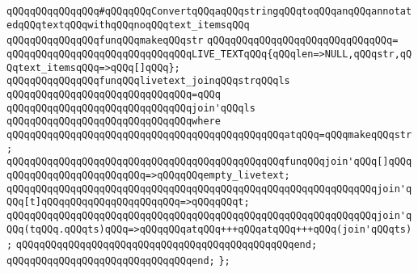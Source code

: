 \newline
\newline
\verb|qQQqqQQqqQQqqQQq#qQQqqQQqConvertqQQqaqQQqstringqQQqtoqQQqanqQQqannotatedqQQqtextqQQqwithqQQqnoqQQqtext_itemsqQQq|\newline
\newline
\verb|qQQqqQQqqQQqqQQqfunqQQqmakeqQQqstr|\newline
\verb|qQQqqQQqqQQqqQQqqQQqqQQqqQQqqQQq=|\newline
\verb|qQQqqQQqqQQqqQQqqQQqqQQqqQQqqQQqLIVE_TEXTqQQq{qQQqlen=>NULL,qQQqstr,qQQqtext_itemsqQQq=>qQQq[]qQQq};|\newline
\newline
\newline
\verb|qQQqqQQqqQQqqQQqfunqQQqlivetext_joinqQQqstrqQQqls|\newline
\verb|qQQqqQQqqQQqqQQqqQQqqQQqqQQqqQQq=qQQq|\newline
\verb|qQQqqQQqqQQqqQQqqQQqqQQqqQQqqQQqjoin'qQQqls|\newline
\verb|qQQqqQQqqQQqqQQqqQQqqQQqqQQqqQQqwhere|\newline
\verb|qQQqqQQqqQQqqQQqqQQqqQQqqQQqqQQqqQQqqQQqqQQqqQQqatqQQq=qQQqmakeqQQqstr;|\newline
\newline
\verb|qQQqqQQqqQQqqQQqqQQqqQQqqQQqqQQqqQQqqQQqqQQqqQQqfunqQQqjoin'qQQq[]qQQqqQQqqQQqqQQqqQQqqQQqqQQq=>qQQqqQQqempty_livetext;|\newline
\verb|qQQqqQQqqQQqqQQqqQQqqQQqqQQqqQQqqQQqqQQqqQQqqQQqqQQqqQQqqQQqqQQqjoin'qQQq[t]qQQqqQQqqQQqqQQqqQQqqQQq=>qQQqqQQqt;|\newline
\verb|qQQqqQQqqQQqqQQqqQQqqQQqqQQqqQQqqQQqqQQqqQQqqQQqqQQqqQQqqQQqqQQqjoin'qQQq(tqQQq.qQQqts)qQQq=>qQQqqQQqatqQQq+++qQQqatqQQq+++qQQq(join'qQQqts);|\newline
\verb|qQQqqQQqqQQqqQQqqQQqqQQqqQQqqQQqqQQqqQQqqQQqqQQqend;|\newline
\verb|qQQqqQQqqQQqqQQqqQQqqQQqqQQqqQQqend;|\newline
\newline
\verb|};|\newline
\newline

